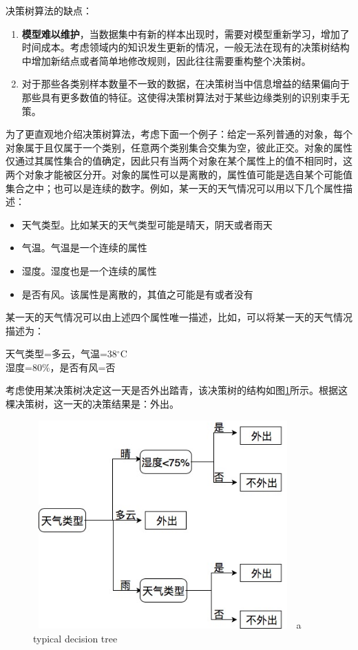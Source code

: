 决策树算法的缺点：
\begin{enumerate}
  \item \textbf{模型难以维护}，当数据集中有新的样本出现时，需要对模型重新学习，增加了时间成本。考虑领域内的知识发生更新的情况，一般无法在现有的决策树结构中增加新结点或者简单地修改规则，因此往往需要重构整个决策树。
  \item 对于那些各类别样本数量不一致的数据，在决策树当中信息增益的结果偏向于那些具有更多数值的特征。这使得决策树算法对于某些边缘类别的识别束手无策。
\end{enumerate}



为了更直观地介绍决策树算法，考虑下面一个例子：给定一系列普通的对象，每个对象属于且仅属于一个类别，任意两个类别集合交集为空，彼此正交。对象的属性仅通过其属性集合的值确定，因此只有当两个对象在某个属性上的值不相同时，这两个对象才能被区分开。对象的属性可以是离散的，属性值可能是选自某个可能值集合之中；也可以是连续的数字。例如，某一天的天气情况可以用以下几个属性描述：

\begin{itemize}

\item 天气类型。比如某天的天气类型可能是晴天，阴天或者雨天
\item 气温。气温是一个连续的属性
\item 湿度。湿度也是一个连续的属性
\item 是否有风。该属性是离散的，其值之可能是有或者没有

\end{itemize}

某一天的天气情况可以由上述四个属性唯一描述，比如，可以将某一天的天气情况描述为：

\begin{center}
天气类型=多云，气温=38$^{\circ}$C \\
湿度=80\%，是否有风=否 \\
\end{center}

考虑使用某决策树决定这一天是否外出踏青，该决策树的结构如图\ref{fig:ch2-1}所示。根据这棵决策树，这一天的决策结果是：外出。

\begin{figure}[!htp]
  \centering
  \includegraphics[width=10cm,height=8cm]{figure/决策树.jpg}
    {a typical decision tree}
  \label{fig:ch2-1}
\end{figure}


